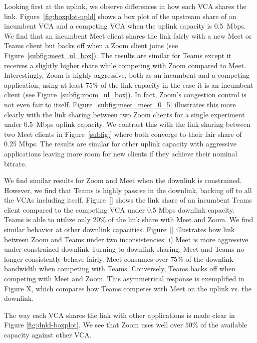 Looking first at the uplink, we observe differences in how each VCA shares the link. Figure~\ref{fig:boxplot-upld} shows a box plot of the upstream share of an incumbent VCA and a competing VCA when the uplink capacity is 0.5~Mbps.  We find that an incumbent Meet client shares the link fairly with a new Meet or Teams client but backs off when a Zoom client joins (see Figure~\ref{subfig:meet_ul_box}). The results are similar for Teams except it receives a slightly higher share while competing with Zoom compared to Meet. Interestingly, Zoom is highly aggressive, both as an incumbent and a competing application, using at least $75\%$ of the link capacity in the case it is an incumbent client (see Figure~\ref{subfig:zoom_ul_box}). In fact, Zoom's congestion control is not even fair to itself. Figure~\ref{subfig:meet_meet_0_5} illustrates this more clearly with the link sharing between two Zoom clients for a single experiment under 0.5~Mbps uplink capacity. We contrast this with the link sharing between two Meet clients in Figure~\ref{subfig:} where both converge to their fair share of 0.25 Mbps. The results are similar for other uplink capacity with aggressive applications leaving more room for new clients if they achieve their nominal bitrate.  %

We find similar results for Zoom and Meet when the downlink is constrained. However, we find that Teams is highly passive in the downlink, backing off to all the VCAs including itself. Figure~\ref{} shows the link share of an incumbent Teams client compared to the competing VCA under 0.5 Mbps downlink capacity. Teams is able to utilize only 20\% of the link share with Meet and Zoom. We find similar behavior at other downlink capacities. Figure~\ref{} illustrates how link between Zoom and Teams under  two inconsistencies: i) Meet is more aggressive under constrained downlink Turning to downlink sharing, Meet and Teams no longer consistently behave fairly. Meet consumes over $75\%$ of the downlink bandwidth when competing with Teams. Conversely, Teams backs off when competing with Meet and Zoom. This asymmetrical response is exemplified in Figure X, which compares how Teams competes with Meet on the uplink vs. the downlink. 



The way each VCA shares the link with other applications is made clear in Figure \ref{fig:dnld-boxplot}. We see that Zoom uses well over $50\%$ of the available capacity against other VCA.

